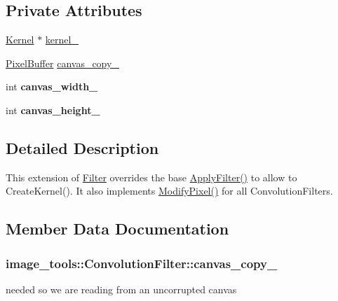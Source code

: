 \subsection*{Private Attributes}
\begin{DoxyCompactItemize}
\item 
\hyperlink{classimage__tools_1_1Kernel}{Kernel} $\ast$ \hyperlink{classimage__tools_1_1ConvolutionFilter_afb11679d9c73c3123ea0b1a14ae4d682}{kernel\+\_\+}
\item 
\hyperlink{classimage__tools_1_1PixelBuffer}{Pixel\+Buffer} \hyperlink{classimage__tools_1_1ConvolutionFilter_aa347f35852e3258219e191db7872634b}{canvas\+\_\+copy\+\_\+}
\item 
int {\bfseries canvas\+\_\+width\+\_\+}\hypertarget{classimage__tools_1_1ConvolutionFilter_acff2289c871cedee381e055a74e06672}{}\label{classimage__tools_1_1ConvolutionFilter_acff2289c871cedee381e055a74e06672}

\item 
int {\bfseries canvas\+\_\+height\+\_\+}\hypertarget{classimage__tools_1_1ConvolutionFilter_a1678a346b6e2f339c466b8ff12c5d892}{}\label{classimage__tools_1_1ConvolutionFilter_a1678a346b6e2f339c466b8ff12c5d892}

\end{DoxyCompactItemize}


\subsection{Detailed Description}
This extension of \hyperlink{classimage__tools_1_1Filter}{Filter} overrides the base \hyperlink{classimage__tools_1_1Filter_a109d756cc63f596508b3a8e02e89b4bf}{Apply\+Filter()} to allow to Create\+Kernel(). It also implements \hyperlink{classimage__tools_1_1ConvolutionFilter_a73fa6a5a04b95f36a92fcb1b701a3df0}{Modify\+Pixel()} for all Convolution\+Filters. 

\subsection{Member Data Documentation}
\subsubsection[{\texorpdfstring{canvas\+\_\+copy\+\_\+}{canvas_copy_}}]{ image\+\_\+tools\+::\+Convolution\+Filter\+::canvas\+\_\+copy\+\_\+\hspace{0.3cm}{\ttfamily [private]}}\hypertarget{classimage__tools_1_1ConvolutionFilter_aa347f35852e3258219e191db7872634b}{}\label{classimage__tools_1_1ConvolutionFilter_aa347f35852e3258219e191db7872634b}
needed so we are reading from an uncorrupted canvas 
